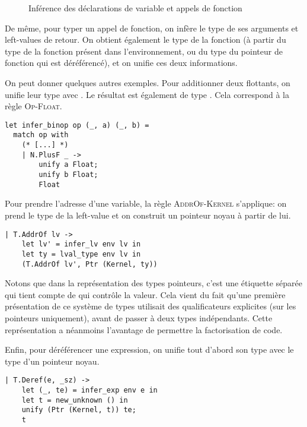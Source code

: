 \begin{figure}[h] %


\caption{Inférence des déclarations de variable et appels de
         fonction}

\label{fig:implem-unif-stmt}
\end{figure}%

De même, pour typer un appel de fonction, on infère le type de ses arguments et
left-values de retour. On obtient également le type de la fonction (à partir du
type de la fonction présent dans l'environnement, ou du type du pointeur de
fonction qui est déréférencé), et on unifie ces deux informations.

On peut donner quelques autres exemples. Pour additionner deux flottants, on
unifie leur type avec \tFloat. Le résultat est également de type \tFloat. Cela
correspond à la règle \textsc{Op-Float}.

\begin{verbatim}
let infer_binop op (_, a) (_, b) =
  match op with
    (* [...] *)
    | N.PlusF _ ->
        unify a Float;
        unify b Float;
        Float
\end{verbatim}

Pour prendre l'adresse d'une variable, la règle \textsc{AddrOf-Kernel}
s'applique: on prend le type de la left-value et on construit un pointeur noyau
à partir de lui.

\begin{verbatim}
| T.AddrOf lv ->
    let lv' = infer_lv env lv in
    let ty = lval_type env lv in
    (T.AddrOf lv', Ptr (Kernel, ty))
\end{verbatim}

\label{page:qualifs-pas-qualifs}
Notons que dans la représentation des types pointeurs, c'est une étiquette
séparée qui tient compte de qui contrôle la valeur. Cela vient du fait qu'une
première présentation de ce système de types utilisait des qualificateurs
explicites (sur les pointeurs uniquement), avant de passer à deux types
indépendants. Cette représentation a néanmoins l'avantage de permettre la
factorisation de code.

Enfin, pour déréférencer une expression, on unifie tout d'abord son type avec le
type d'un pointeur noyau.

\begin{verbatim}
| T.Deref(e, _sz) ->
    let (_, te) = infer_exp env e in
    let t = new_unknown () in
    unify (Ptr (Kernel, t)) te;
    t
\end{verbatim}

